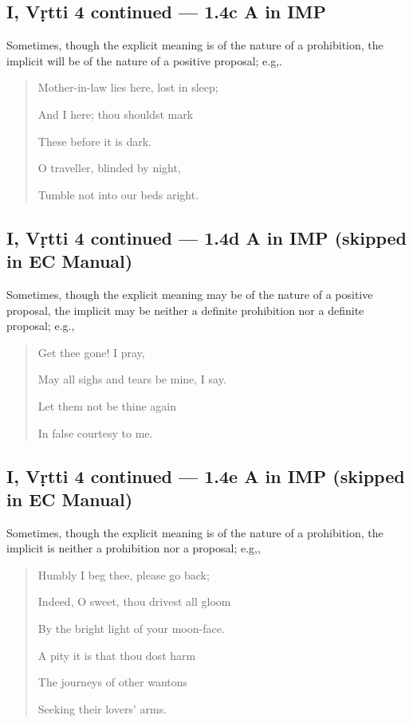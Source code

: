 \documentclass[12pt]{book}
\begin{document}
\subsection{I, Vṛtti 4 continued --- 1.4c A in IMP}

Sometimes, though the explicit meaning is of the nature of
a prohibition, the implicit will be of the nature of a positive
proposal; e.g,.

\begin{quotation}
\begin{em}
Mother-in-law lies here, lost in sleep;

And I here; thou shouldst mark

These before it is dark.

O traveller, blinded by night,

Tumble not into our beds aright.
\end{em}
\end{quotation}


\subsection{I, Vṛtti 4 continued --- 1.4d A in IMP (skipped in EC Manual)}

Sometimes, though the explicit meaning may be of the nature
of a positive proposal, the implicit may be neither a definite
prohibition nor a definite proposal; e.g.,

\begin{quotation}
\begin{em}
Get thee gone! I pray,

May all sighs and tears be mine, I say.

Let them not be thine again

In false courtesy to me.
\end{em}
\end{quotation}


\subsection{I, Vṛtti 4 continued --- 1.4e A in IMP (skipped in EC Manual)}

Sometimes, though the explicit meaning is of the nature of a
prohibition, the implicit is neither a prohibition nor a proposal;
e.g,,

\begin{quotation}
\begin{em}
Humbly I beg thee, please go back;

Indeed, O sweet, thou drivest all gloom

By the bright light of your moon-face.

A pity it is that thou dost harm

The journeys of other wantons

Seeking their lovers' arms.
\end{em}
\end{quotation}
\end{document}
